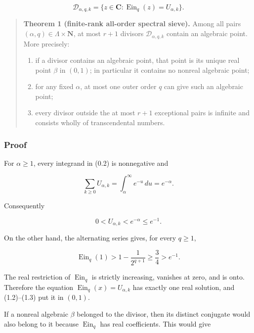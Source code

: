 \[
 \mathcal D_{\alpha,q,k}
 =\{z\in\mathbf C:
 \operatorname{Ein}_q(z)=U_{\alpha,k}\}.                      \tag{GS-1.1}
\]

\begin{quote}
\textbf{Theorem 1 (finite-rank all-order spectral sieve).} Among all pairs
\((\alpha,q)\in\Lambda\times\mathbf N\), at most \(r+1\) divisors
\(\mathcal D_{\alpha,q,k}\) contain an algebraic point. More precisely:

\begin{enumerate}
\def\labelenumi{\arabic{enumi}.}
\tightlist
\item
  if a divisor contains an algebraic point, that point is its unique real
  point \(\beta\) in \((0,1)\); in particular it contains no nonreal
  algebraic point;
\item
  for any fixed \(\alpha\), at most one outer order \(q\) can give such an
  algebraic point;
\item
  every divisor outside the at most \(r+1\) exceptional pairs is infinite
  and consists wholly of transcendental numbers.
\end{enumerate}
\end{quote}

\subsubsection{Proof}

For \(\alpha\geq1\), every integrand in (0.2) is nonnegative and

\[
 \sum_{k\geq0}U_{\alpha,k}
 =\int_\alpha^\infty e^{-u}\,du=e^{-\alpha}.
\]

Consequently

\[
 0<U_{\alpha,k}<e^{-\alpha}\leq e^{-1}.                       \tag{GS-1.2}
\]

On the other hand, the alternating series gives, for every \(q\geq1\),

\[
 \operatorname{Ein}_q(1)
 >1-\frac1{2^{q+1}}\geq\frac34>e^{-1}.                        \tag{GS-1.3}
\]

The real restriction of \(\operatorname{Ein}_q\) is strictly increasing,
vanishes at zero, and is onto. Therefore the equation
\(\operatorname{Ein}_q(x)=U_{\alpha,k}\) has exactly one real solution,
and (1.2)--(1.3) put it in \((0,1)\).

If a nonreal algebraic \(\beta\) belonged to the divisor, then its distinct
conjugate would also belong to it because \(\operatorname{Ein}_q\) has real
coefficients. This would give

